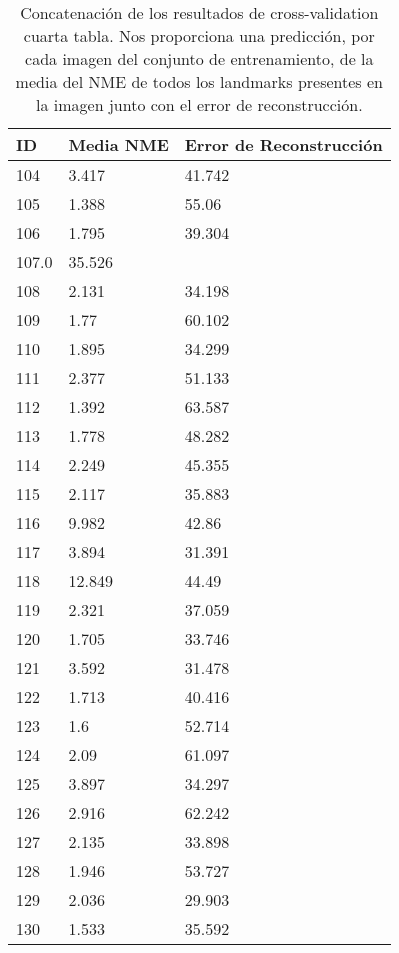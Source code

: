 \begin{table}[!ht]
    \centering
    \caption{Concatenación de los resultados de cross-validation cuarta tabla. Nos proporciona una predicción, por cada imagen del conjunto de entrenamiento, de la media del NME de todos los landmarks presentes en la imagen junto con el error de reconstrucción.}
    \begin{tabular}{|l|l|l|}
    \hline
        \cellcolor{gray!25}\textbf{ID} & \cellcolor{gray!25}\textbf{Media NME} & \cellcolor{gray!25}\textbf{Error de Reconstrucción} \\ \hline
        104 & 3.417 & 41.742 \\ \hline
        105 & 1.388 & 55.06 \\ \hline
        106 & 1.795 & 39.304 \\ \hline
        107.0 & 35.526 & ~ \\ \hline
        108 & 2.131 & 34.198 \\ \hline
        109 & 1.77 & 60.102 \\ \hline
        110 & 1.895 & 34.299 \\ \hline
        111 & 2.377 & 51.133 \\ \hline
        112 & 1.392 & 63.587 \\ \hline
        113 & 1.778 & 48.282 \\ \hline
        114 & 2.249 & 45.355 \\ \hline
        115 & 2.117 & 35.883 \\ \hline
        116 & 9.982 & 42.86 \\ \hline
        117 & 3.894 & 31.391 \\ \hline
        118 & 12.849 & 44.49 \\ \hline
        119 & 2.321 & 37.059 \\ \hline
        120 & 1.705 & 33.746 \\ \hline
        121 & 3.592 & 31.478 \\ \hline
        122 & 1.713 & 40.416 \\ \hline
        123 & 1.6 & 52.714 \\ \hline
        124 & 2.09 & 61.097 \\ \hline
        125 & 3.897 & 34.297 \\ \hline
        126 & 2.916 & 62.242 \\ \hline
        127 & 2.135 & 33.898 \\ \hline
        128 & 1.946 & 53.727 \\ \hline
        129 & 2.036 & 29.903 \\ \hline
        130 & 1.533 & 35.592 \\ \hline
    \end{tabular}
    \label{table:ModelBase_landmarkresume}
\end{table}

\endinput

